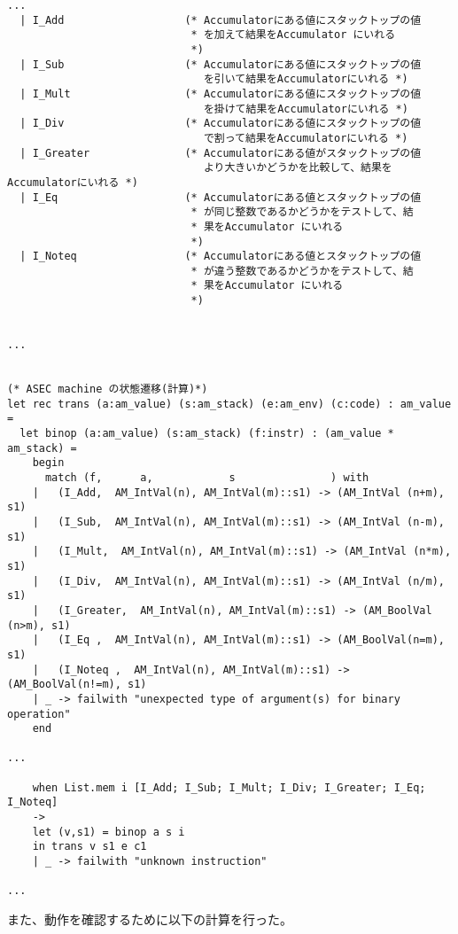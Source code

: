 \documentclass[a4paper,9pt]{jarticle}
\begin{document}
\begin{lstlisting}
...
  | I_Add                   (* Accumulatorにある値にスタックトップの値
                             * を加えて結果をAccumulator にいれる
                             *)
  | I_Sub                   (* Accumulatorにある値にスタックトップの値
                               を引いて結果をAccumulatorにいれる *)
  | I_Mult                  (* Accumulatorにある値にスタックトップの値
                               を掛けて結果をAccumulatorにいれる *)
  | I_Div                   (* Accumulatorにある値にスタックトップの値
                               で割って結果をAccumulatorにいれる *)
  | I_Greater               (* Accumulatorにある値がスタックトップの値
                               より大きいかどうかを比較して、結果をAccumulatorにいれる *)
  | I_Eq                    (* Accumulatorにある値とスタックトップの値
                             * が同じ整数であるかどうかをテストして、結
                             * 果をAccumulator にいれる
                             *)
  | I_Noteq                 (* Accumulatorにある値とスタックトップの値
                             * が違う整数であるかどうかをテストして、結
                             * 果をAccumulator にいれる
                             *)


...


(* ASEC machine の状態遷移(計算)*)
let rec trans (a:am_value) (s:am_stack) (e:am_env) (c:code) : am_value =
  let binop (a:am_value) (s:am_stack) (f:instr) : (am_value * am_stack) =
    begin
      match (f,      a,            s               ) with
	|   (I_Add,  AM_IntVal(n), AM_IntVal(m)::s1) -> (AM_IntVal (n+m), s1)
	|   (I_Sub,  AM_IntVal(n), AM_IntVal(m)::s1) -> (AM_IntVal (n-m), s1)
	|   (I_Mult,  AM_IntVal(n), AM_IntVal(m)::s1) -> (AM_IntVal (n*m), s1)
	|   (I_Div,  AM_IntVal(n), AM_IntVal(m)::s1) -> (AM_IntVal (n/m), s1)
	|   (I_Greater,  AM_IntVal(n), AM_IntVal(m)::s1) -> (AM_BoolVal (n>m), s1)
	|   (I_Eq ,  AM_IntVal(n), AM_IntVal(m)::s1) -> (AM_BoolVal(n=m), s1)
	|   (I_Noteq ,  AM_IntVal(n), AM_IntVal(m)::s1) -> (AM_BoolVal(n!=m), s1)
	| _ -> failwith "unexpected type of argument(s) for binary operation"
    end

...

	when List.mem i [I_Add; I_Sub; I_Mult; I_Div; I_Greater; I_Eq; I_Noteq] 
	-> 
	let (v,s1) = binop a s i
	in trans v s1 e c1
    | _ -> failwith "unknown instruction" 

...
\end{lstlisting}

また、動作を確認するために以下の計算を行った。
\end{document}
